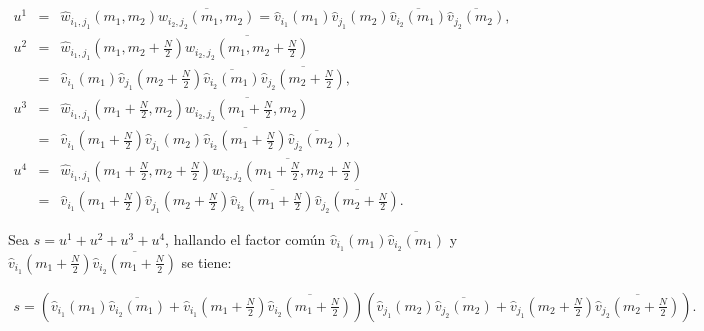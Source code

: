\begin{eqnarray}
u^1&=&\hat{w}_{i_1,j_1}(m_1,m_2)\overline{\hat{w}_{i_2,j_2}(m_1,m_2)}=\hat{v}_{i_1}(m_1)\hat{v}_{j_1}(m_2)\overline{\hat{v}_{i_2}(m_1)}\overline{\hat{v}_{j_2}(m_2)},\nonumber\\
u^2&=&\hat{w}_{i_1,j_1}\left(m_1,m_2+\frac{N}{2}\right)\overline{\hat{w}_{i_2,j_2}\left(m_1,m_2+\frac{N}{2}\right)}\nonumber\\&=&\hat{v}_{i_1}(m_1)\hat{v}_{j_1}\left(m_2+\frac{N}{2}\right)\overline{\hat{v}_{i_2}(m_1)}\overline{\hat{v}_{j_2}\left(m_2+\frac{N}{2}\right)},\nonumber\\
u^3&=&\hat{w}_{i_1,j_1}\left(m_1+\frac{N}{2},m_2\right)\overline{\hat{w}_{i_2,j_2}\left(m_1+\frac{N}{2},m_2\right)}\nonumber\\&=&\hat{v}_{i_1}\left(m_1+\frac{N}{2}\right)\hat{v}_{j_1}\left(m_2\right)\overline{\hat{v}_{i_2}\left(m_1+\frac{N}{2}\right)}\overline{\hat{v}_{j_2}\left(m_2\right)},\nonumber\\
u^4&=&\hat{w}_{i_1,j_1}\left(m_1+\frac{N}{2},m_2+\frac{N}{2}\right)\overline{\hat{w}_{i_2,j_2}\left(m_1+\frac{N}{2},m_2+\frac{N}{2}\right)}\nonumber\\&=&\hat{v}_{i_1}\left(m_1+\frac{N}{2}\right)\hat{v}_{j_1}\left(m_2+\frac{N}{2}\right)\overline{\hat{v}_{i_2}\left(m_1+\frac{N}{2}\right)}\overline{\hat{v}_{j_2}\left(m_2+\frac{N}{2}\right)}.\nonumber
\end{eqnarray}

\par Sea $s=u^1+u^2+u^3+u^4$, hallando el factor com\'un $\hat{v}_{i_1}(m_1)\overline{\hat{v}_{i_2}(m_1)}$ y\linebreak $\hat{v}_{i_1}\left(m_1+\frac{N}{2}\right)\overline{\hat{v}_{i_2}\left(m_1+\frac{N}{2}\right)}$ se tiene:
\begin{scriptsize}
\begin{eqnarray}
s=\left(\hat{v}_{i_1}(m_1)\overline{\hat{v}_{i_2}(m_1)}+\hat{v}_{i_1}\left(m_1+\frac{N}{2}\right)\overline{\hat{v}_{i_2}\left(m_1+\frac{N}{2}\right)}\right)\left(\hat{v}_{j_1}(m_2)\overline{\hat{v}_{j_2}(m_2)}+\hat{v}_{j_1}\left(m_2+\frac{N}{2}\right)\overline{\hat{v}_{j_2}\left(m_2+\frac{N}{2}\right)}\right).\nonumber
\end{eqnarray}
\end{scriptsize}

